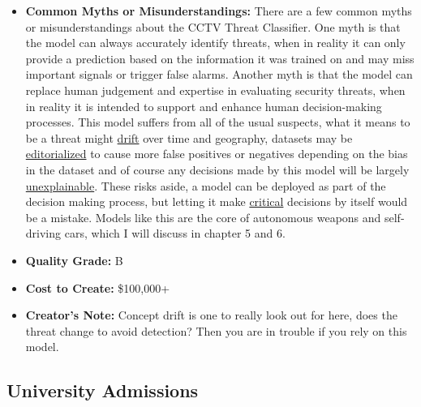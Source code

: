 \begin{itemize}
    \item \textbf{Common Myths or Misunderstandings:} There are a few common myths or misunderstandings about the CCTV Threat Classifier. One myth is that the model can always accurately identify threats, when in reality it can only provide a prediction based on the information it was trained on and may miss important signals or trigger false alarms. Another myth is that the model can replace human judgement and expertise in evaluating security threats, when in reality it is intended to support and enhance human decision-making processes. This model suffers from all of the usual suspects, what it means to be a threat might \hyperref[sec:drift]{drift} over time and geography, datasets may be \hyperref[sec:janitor]{editorialized} to cause more false positives or negatives depending on the bias in the dataset and of course any decisions made by this model will be largely \hyperref[sec:explain]{unexplainable}. These risks aside, a model can be deployed as part of the decision making process, but letting it make \hyperref[sec:creative]{critical} decisions by itself would be a mistake. Models like this are the core of autonomous weapons and self-driving cars, which I will discuss in chapter 5 and 6.
    \item \textbf{Quality Grade:} B
    \item \textbf{Cost to Create:} \$100,000+
    \item \textbf{Creator's Note:} Concept drift is one to really look out for here, does the threat change to avoid detection? Then you are in trouble if you rely on this model.
\end{itemize}


\subsection{University Admissions}

